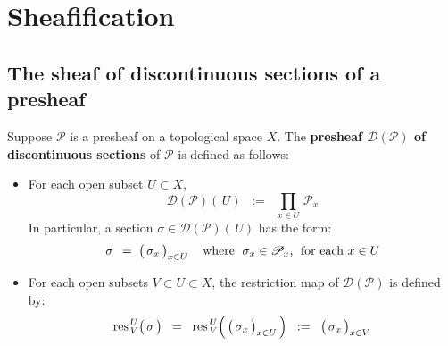 

\section{Sheafification}


\renewcommand{\theenumi}{\roman{enumi}}
\renewcommand{\labelenumi}{\textnormal{(\theenumi)}$\;\;$}


\subsection{The sheaf of discontinuous sections of a presheaf}
\setcounter{theorem}{0}
\setcounter{equation}{0}

\begin{definition}
\mbox{}\vskip 0.1cm
\noindent
Suppose $\mathscr{P}$ is a presheaf on a topological space $X$.
\vskip 0.1cm
\noindent
The \textbf{presheaf $\mathscr{D}(\mathscr{P})$ of discontinuous sections} of $\mathscr{P}$
is defined as follows:
\begin{itemize}
\item
	For each open subset $U \subset X$,
	\begin{equation*}
	\mathscr{D}(\mathscr{P})(\,U)
	\;\; := \;\;
		\underset{x \in U}{\prod} \, \mathscr{P}_{x}
	\end{equation*}
	In particular, a section $\sigma \in \mathscr{D}(\mathscr{P})(\,U)$ has the form:
	\begin{equation*}
	\sigma
	\;\, = \;
		\left(\,\overset{{\color{white}.}}{\sigma_{x}}\,\right)_{x \in U}
	\quad
	\textnormal{where \;$\sigma_{x} \in \mathscr{P}_{x}$,\; for each $x \in U$}
	\end{equation*}
\item
	For each open subsets $V \subset U \subset X$,
	the restriction map of $\mathscr{D}(\mathscr{P})$ is defined by:
	\begin{equation*}
	\res^{\,U}_{\,V}\!\left(\,\overset{{\color{white}.}}{\sigma}\,\right)
	\;\; = \;\;
		\res^{\,U}_{\,V}\!\left(\,\left(\,\overset{{\color{white}.}}{\sigma_{x}}\,\right)_{x \in U}\,\right)
	\;\; := \;\;
		\left(\,\overset{{\color{white}.}}{\sigma_{x}}\,\right)_{x \in V}
	\end{equation*}
\end{itemize}
\end{definition}

